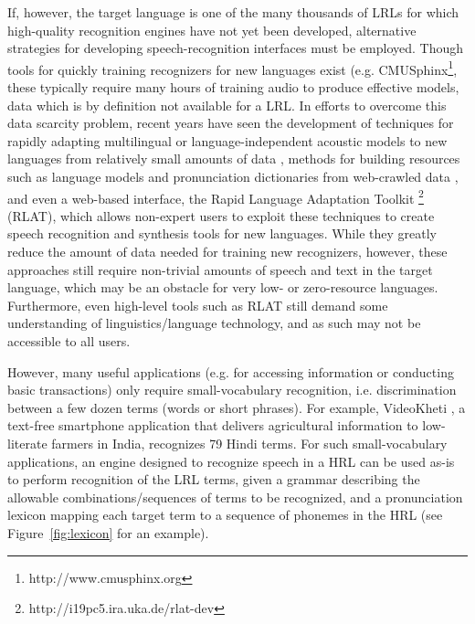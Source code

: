 \documentclass[11pt]{article}
\begin{document}
If, however, the target language is one of the many thousands of LRLs for which high-quality recognition engines have not yet been developed, alternative strategies for developing speech-recognition interfaces must be employed.
Though tools for quickly training recognizers for new languages exist (e.g. CMUSphinx\footnote{http://www.cmusphinx.org}, these typically require many hours of training audio to produce effective models, 
data which is by definition not available for a LRL.
In efforts to overcome this data scarcity problem, recent years have seen the development of techniques for rapidly adapting multilingual or language-independent acoustic models to new languages from relatively small amounts of data \cite{schultz01}, methods for building resources such as language models and pronunciation dictionaries from web-crawled data \cite{vu10,Schlippe14}, and even a web-based interface, the Rapid Language Adaptation Toolkit
\footnote{http://i19pc5.ira.uka.de/rlat-dev}
(RLAT), 
which allows non-expert users to exploit these techniques to create speech recognition and synthesis tools for new languages. 
While they greatly reduce the amount of data needed for training new recognizers, however, these approaches still require non-trivial amounts of speech and text in the target language, which may be an obstacle for very low- or zero-resource languages. Furthermore, even high-level tools such as RLAT still demand some understanding of linguistics/language technology, and as such may not be accessible to all users.

However, many useful %
applications (e.g. for accessing information or conducting basic transactions) only require small-vocabulary recognition, i.e. discrimination between
a few dozen terms (words or short phrases).
For example, VideoKheti \cite{bali13}, a text-free smartphone application that delivers agricultural information to low-literate farmers in India, 
recognizes 79 Hindi terms.
For such small-vocabulary applications, 
an engine designed to recognize speech in a HRL
can be used as-is to perform recognition of the LRL terms,
given
a grammar describing the allowable combinations/sequences of terms to be recognized, and a pronunciation lexicon mapping each target term to a sequence of phonemes in the HRL 
(see Figure~\ref{fig:lexicon} for an example).
\end{document}
